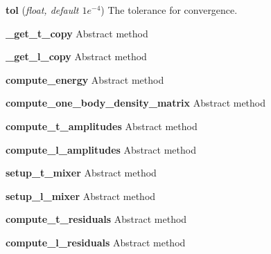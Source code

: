 \begin{tcolorbox}
{\begin{adjustwidth}{4em}{}
        \hspace{1.5em} \textbf{tol} (\emph{float, default $1e^{-4}$})
            The tolerance for convergence.

        \end{adjustwidth}
        
    \hspace{2em} \textbf{\_get\_t\_copy} Abstract method

    \hspace{2em} \textbf{\_get\_l\_copy} Abstract method

    \hspace{2em} \textbf{compute\_energy} Abstract method

    \hspace{2em} \textbf{compute\_one\_body\_density\_matrix} Abstract method

    \hspace{2em} \textbf{compute\_t\_amplitudes} Abstract method

    \hspace{2em} \textbf{compute\_l\_amplitudes} Abstract method

    \hspace{2em} \textbf{setup\_t\_mixer} Abstract method

    \hspace{2em} \textbf{setup\_l\_mixer} Abstract method

    \hspace{2em} \textbf{compute\_t\_residuals} Abstract method

    \hspace{2em} \textbf{compute\_l\_residuals} Abstract method

    }
\end{tcolorbox}